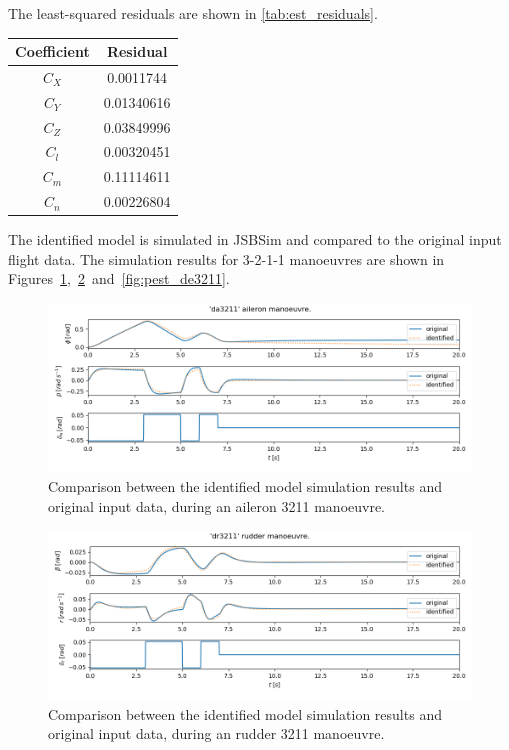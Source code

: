 The least-squared residuals are shown in \autoref{tab:est_residuals}. 

\begin{center}
\begin{tabular}{ c | c}
Coefficient & Residual \\
\hline\hline
${C_X}$ & 0.0011744 \\ 
${C_Y}$ & 0.01340616 \\
${C_Z}$ & 0.03849996 \\
${C_l}$ & 0.00320451 \\
${C_m}$ & 0.11114611 \\
${C_n}$ & 0.00226804 
\label{tab:est_residuals}
\end{tabular}
\end{center}

The identified model is simulated in JSBSim and compared to the original input flight data. The simulation results for 3-2-1-1 manoeuvres are shown in Figures~\ref{fig:pest_da3211},~\ref{fig:pest_dr3211}~and~\ref{fig:pest_de3211}.\\

\begin{figure}
    \centering
    \includegraphics[width=14cm]{figures/pest_da3211.png}
    \caption{Comparison between the identified model simulation results and original input data, during an aileron 3211 manoeuvre.}
    \label{fig:pest_da3211}
\end{figure}

\begin{figure}
    \centering
    \includegraphics[width=14cm]{figures/pest_dr3211.png}
    \caption{Comparison between the identified model simulation results and original input data, during an rudder 3211 manoeuvre.}
    \label{fig:pest_dr3211}
\end{figure}

